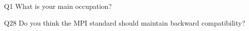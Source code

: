 \begin{description}%
\item{Q1} What is your main occupation?%
\item{Q28} Do you think the MPI standard should maintain backward compatibility?%
\end{description}%
